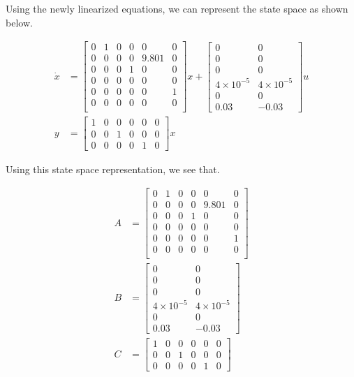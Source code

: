 \documentclass{article}
\begin{document}
    Using the newly linearized equations, we can represent the state space
    as shown below.

    \begin{align}
        \dot{x} &= \begin{bmatrix}
                       0 & 1 & 0 & 0 & 0 & 0 \\
                       0 & 0 & 0 & 0 & 9.801 & 0 \\
                       0 & 0 & 0 & 1 & 0 & 0 \\
                       0 & 0 & 0 & 0 & 0 & 0 \\
                       0 & 0 & 0 & 0 & 0 & 1 \\
                       0 & 0 & 0 & 0 & 0 & 0 \\
        \end{bmatrix}
        x + \begin{bmatrix} 0 & 0 \\ 0 & 0 \\ 0 & 0 \\ 4 \times 10^{-5} &
        4 \times 10^{-5} \\ 0 & 0 \\ 0.03 & -0.03 \end{bmatrix}u\\
        y &= \begin{bmatrix} 1 & 0 & 0 & 0 & 0 & 0 \\
            0 & 0 & 1 & 0 & 0 & 0 \\ 0 & 0 & 0 & 0 & 1 & 0 \end{bmatrix}x
    \end{align}

    Using this state space representation, we see that.

    \begin{align}
        A &= \begin{bmatrix}
                 0 & 1 & 0 & 0 & 0 & 0 \\
                 0 & 0 & 0 & 0 & 9.801 & 0 \\
                 0 & 0 & 0 & 1 & 0 & 0 \\
                 0 & 0 & 0 & 0 & 0 & 0 \\
                 0 & 0 & 0 & 0 & 0 & 1 \\
                 0 & 0 & 0 & 0 & 0 & 0 \\
        \end{bmatrix}\\
        B &= \begin{bmatrix} 0 & 0 \\ 0 & 0 \\ 0 & 0 \\ 4 \times 10^{-5} &
        4 \times 10^{-5} \\ 0 & 0 \\ 0.03 & -0.03 \end{bmatrix}\\
        C &= \begin{bmatrix} 1 & 0 & 0 & 0 & 0 & 0 \\
            0 & 0 & 1 & 0 & 0 & 0 \\ 0 & 0 & 0 & 0 & 1 & 0 \end{bmatrix}
    \end{align}
\end{document}
